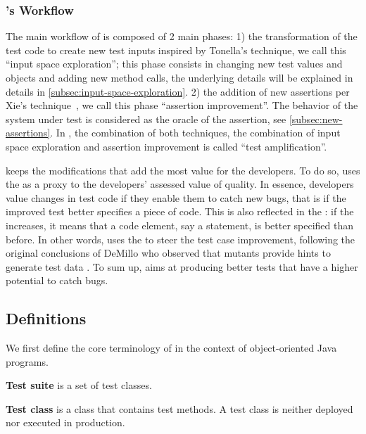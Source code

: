 \subsubsection{\dspot's Workflow}

The main workflow of \dspot{} is composed of 2 main phases:
1) the transformation of the test code to create new test inputs inspired by Tonella's technique, we call this ``input space exploration''; this phase consists in changing new test values and objects and adding new method calls, the underlying details will be explained in details in \autoref{subsec:input-space-exploration}.
2) the addition of new assertions per Xie's technique~\cite{TaoXie2006}, we call this phase ``assertion improvement''. The behavior of the system under test is considered as the oracle of the assertion, see \autoref{subsec:new-assertions}.
In \dspot, the combination of both techniques, \ie the combination of input space exploration and assertion improvement is called ``test amplification''.

\dspot keeps the modifications that add the most value for the developers.
To do so, \dspot uses the \ms as a proxy to the developers' assessed value of quality.
In essence, developers value changes in test code if they enable them to catch new bugs, that is if the improved test better specifies a piece of code.
This is also reflected in the \ms: if the \ms increases, it means that a code element, say a statement, is better specified than before. 
In other words, \dspot uses the \ms to steer the test case improvement, following the original conclusions of DeMillo \etal who observed that mutants provide hints to generate test data \cite{demillo1978hints}.
To sum up, \dspot aims at producing better tests that have a higher potential to catch bugs.




\subsection{Definitions}

We first define the core terminology of \dspot in the context of object-oriented Java programs. 

\textbf{Test suite} is a set of test classes.

\textbf{Test class} is a class that contains test methods. A test class is neither deployed nor executed in production.

